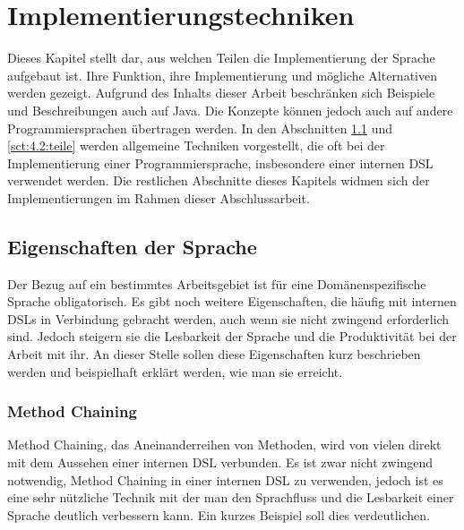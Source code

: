 
\chapter{Implementierungstechniken}\label{chp:4:implementierungstechniken}
Dieses Kapitel stellt dar, aus welchen Teilen die Implementierung der Sprache aufgebaut ist. Ihre Funktion, ihre Implementierung und mögliche Alternativen werden gezeigt. Aufgrund des Inhalts dieser Arbeit beschränken sich Beispiele und Beschreibungen auch auf Java. Die Konzepte können jedoch auch auf andere Programmiersprachen übertragen werden. In den Abschnitten \ref{sct:4.1:eigenschaften} und \ref{sct:4.2:teile} werden allgemeine Techniken vorgestellt, die oft bei der Implementierung einer Programmiersprache, insbesondere einer internen DSL verwendet werden. Die restlichen Abschnitte dieses Kapitels widmen sich der Implementierungen im Rahmen dieser Abschlussarbeit.

\section{Eigenschaften der Sprache}\label{sct:4.1:eigenschaften}
Der Bezug auf ein bestimmtes Arbeitsgebiet ist für eine Domänenspezifische Sprache obligatorisch. Es gibt noch weitere Eigenschaften, die häufig mit internen DSLs in Verbindung gebracht werden, auch wenn sie nicht zwingend erforderlich sind. Jedoch steigern sie die Lesbarkeit der Sprache und die Produktivität bei der Arbeit mit ihr. An dieser Stelle sollen diese Eigenschaften kurz beschrieben werden und beispielhaft  erklärt werden, wie man sie erreicht.

\subsection{Method Chaining}\label{ssct:4.1.1:chaining}
Method Chaining, das Aneinanderreihen von Methoden, wird von vielen direkt mit dem Aussehen einer internen DSL verbunden. Es ist zwar nicht zwingend notwendig, Method Chaining in einer internen DSL zu verwenden, jedoch ist es eine sehr nützliche Technik mit der man den Sprachfluss und die Lesbarkeit einer Sprache deutlich verbessern kann\cite{book:fowlerDSL}. Ein kurzes Beispiel soll dies verdeutlichen.

